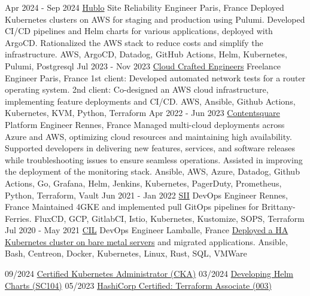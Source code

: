 \documentclass[10pt]{developercv}
\begin{document}
\begin{entrylist}
	\entry
		{Apr 2024 - Sep 2024}
		{\href{https://www.hublo.com/}{Hublo}}
		{Site Reliability Engineer}
		{Paris, France}
		{Deployed Kubernetes clusters on AWS for staging and production using Pulumi.
		Developed CI/CD pipelines and Helm charts for various applications, deployed with ArgoCD.
		Rationalized the AWS stack to reduce costs and simplify the infrastructure.}
		{AWS, ArgoCD, Datadog, GitHub Actions, Helm, Kubernetes, Pulumi, Postgresql}
	\entry
		{Jul 2023 - Nov 2023}
		{\href{https://craftedengineers.cloud/}{Cloud Crafted Engineers}}
		{Freelance Engineer}
		{Paris, France}
		{1st client: Developed automated network tests for a router operating system.
		2nd client: Co-designed an AWS cloud infrastructure, implementing feature deployments and CI/CD.}
		{AWS, Ansible, Github Actions, Kubernetes, KVM, Python, Terraform}
	\entry
		{Apr 2022 - Jun 2023}
		{\href{https://contentsquare.com/}{Contentsquare}}
		{Platform Engineer}
		{Rennes, France}
		{Managed multi-cloud deployments across Azure and AWS, optimizing cloud resources and maintaining high availability.
		Supported developers in delivering new features, services, and software releases while troubleshooting issues to ensure seamless operations.
		Assisted in improving the deployment of the monitoring stack.}
		{Ansible, AWS, Azure, Datadog, Github Actions, Go, Grafana, Helm, Jenkins, Kubernetes, PagerDuty, Prometheus, Python, Terraform, Vault}
	\entry
		{Jun 2021 - Jan 2022}
		{\href{https://sii-group.com/}{SII}}
		{DevOps Engineer}
		{Rennes, France}
		{Maintained 4GKE and implemented pull GitOps pipelines for Brittany-Ferries.}
		{FluxCD, GCP, GitlabCI, Istio, Kubernetes, Kustomize, SOPS, Terraform}
	\entry
		{Jul 2020 - May 2021}
		{\href{https://www.cil-lamballe.com/}{CIL}}
		{DevOps Engineer}
		{Lamballe, France}
		{\href{https://github.com/Ant0wan/VMWare-Kubenetes-cluster}{Deployed a HA Kubernetes cluster on bare metal servers} and migrated applications.}
		{Ansible, Bash, Centreon, Docker, Kubernetes, Linux, Rust, SQL, VMWare}
\end{entrylist}


\begin{entrylist}
	\certentry
		{09/2024}
		{\href{https://ti-user-certificates.s3.amazonaws.com/e0df7fbf-a057-42af-8a1f-590912be5460/e8d771bd-68bf-4ac7-8077-2e885178505a-antoine-barthelemy-21f9eeb4-ead2-4311-ba93-15865ca88f93-certificate.pdf}
		{Certified Kubernetes Administrator (CKA)}}
	\certentry
		{03/2024}
		{\href{https://ti-user-certificates.s3.amazonaws.com/e0df7fbf-a057-42af-8a1f-590912be5460/e8d771bd-68bf-4ac7-8077-2e885178505a-antoine-barthelemy-e9f7d66c-6134-4d58-9f70-9967859a7744-certificate.pdf}
		{Developing Helm Charts (SC104)}}
	\certentry
		{05/2023}
		{\href{https://www.credly.com/badges/7b8f2540-6b35-43a7-84d6-24dceb4001ee/public_url}
		{HashiCorp Certified: Terraform Associate (003)}}

\end{entrylist}
\end{document}

